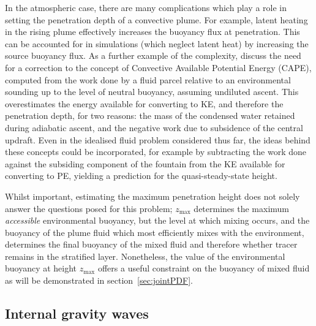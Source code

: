 \documentclass[a4paper]{article}
\begin{document}
In the atmospheric case, there are many complications which play a role in setting the penetration depth
of a convective plume. For example, latent heating in the rising plume effectively increases the buoyancy
flux at penetration. This can be accounted for in simulations (which neglect latent heat) by increasing the
source buoyancy flux. As a further example of the complexity, \citet{tailleux2004} discuss the need for a
correction to the concept of Convective Available Potential Energy (CAPE), computed from the work done by a
fluid parcel relative to an environmental sounding up to the level of neutral buoyancy, assuming undiluted
ascent. This overestimates the energy available for converting to KE, and therefore the penetration depth, for
two reasons: the mass of the condensed water retained during adiabatic ascent, and the negative work due to
subsidence of the central updraft. Even in the idealised fluid problem considered thus far, the ideas behind
these concepts could be incorporated, for example by subtracting the work done against the subsiding component
of the fountain from the KE available for converting to PE, yielding a prediction for the quasi-steady-state
height.

Whilst important, estimating the maximum penetration height does not solely answer the questions posed for
this problem; $z_{\max}$ determines the maximum \emph{accessible} environmental buoyancy, but the level at
which mixing occurs, and the buoyancy of the plume fluid which most efficiently mixes with the environment,
determines the final buoyancy of the mixed fluid and therefore whether tracer remains in the stratified layer.
Nonetheless, the value of the environmental buoyancy at height $z_{\max}$ offers a useful constraint on the
buoyancy of mixed fluid as will be demonstrated in section~\ref{sec:jointPDF}.

\subsection{Internal gravity waves}
\end{document}
